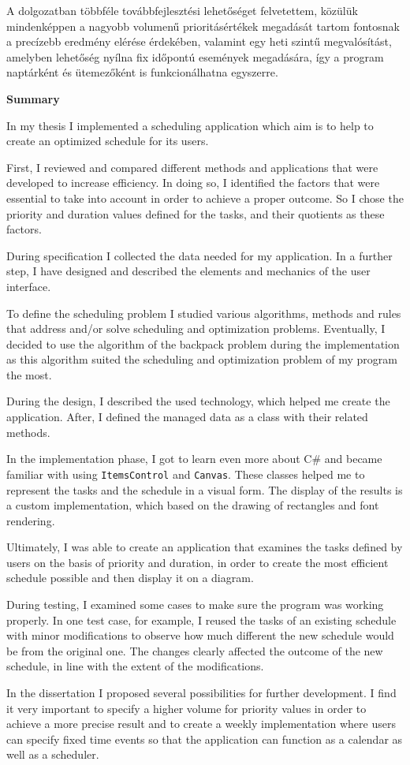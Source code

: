 A dolgozatban többféle továbbfejlesztési lehetőséget felvetettem, közülük mindenképpen a nagyobb volumenű prioritásértékek megadását tartom fontosnak a precízebb eredmény elérése érdekében, valamint egy heti szintű megvalósítást, amelyben lehetőség nyílna fix időpontú események megadására, így a program naptárként és ütemezőként is funkcionálhatna egyszerre.

\newpage
\begin{LARGE}
\textbf{Summary}
\end{LARGE}
\vskip 1cm

In my thesis I implemented a scheduling application which aim is to help to create an optimized schedule for its users.

First, I reviewed and compared different methods and applications that were developed to increase efficiency. In doing so, I identified the factors that were essential to take into account in order to achieve a proper outcome. So I chose the priority and duration values defined for the tasks, and their quotients as these factors.

During specification I collected the data needed for my application.
In a further step, I have designed and described the elements and mechanics of the user interface.

To define the scheduling problem I studied various algorithms, methods and rules that address and/or solve scheduling and optimization problems. Eventually, I decided to use the algorithm of the backpack problem during the implementation as this algorithm suited the scheduling and optimization problem of my program the most.

During the design, I described the used technology, which helped me create the application. After, I defined the managed data as a class with their related methods. 

In the implementation phase, I got to learn even more about C\# and became familiar with using \texttt{ItemsControl} and \texttt{Canvas}. These classes helped me to represent the tasks and the schedule in a visual form.
The display of the results is a custom implementation, which based on the drawing of rectangles and font rendering.

Ultimately, I was able to create an application that examines the tasks defined by users on the basis of priority and duration, in order to create the most efficient schedule possible and then display it on a diagram.

During testing, I examined some cases to make sure the program was working properly. In one test case, for example, I reused the tasks of an existing schedule with minor modifications to observe how much different the new schedule would be from the original one. The changes clearly affected the outcome of the new schedule, in line with the extent of the modifications.

In the dissertation I proposed several possibilities for further development. I find it very important to specify a higher volume for priority values in order to achieve a more precise result and to create a weekly implementation where users can specify fixed time events so that the application can function as a calendar as well as a scheduler.
